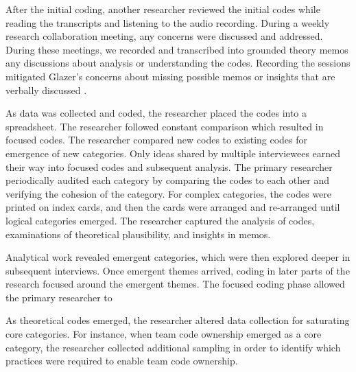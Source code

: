 After the initial coding, another researcher reviewed the initial codes while reading the transcripts and listening to the audio recording. During a weekly research collaboration meeting, any concerns were discussed and addressed. During these meetings, we recorded and transcribed into grounded theory memos any discussions about analysis or understanding the codes. Recording the sessions mitigated Glazer's concerns about missing possible memos or insights that are verbally discussed \cite{GlaserTheoreticalSensitivity}.

As data was collected and coded, the researcher placed the codes into a spreadsheet. The researcher followed constant comparison which resulted in focused codes.  The researcher compared new codes to existing codes for emergence of new categories. Only ideas shared by multiple interviewees earned their way into focused codes and subsequent analysis. The primary researcher periodically audited each category by comparing the codes to each other and verifying the cohesion of the category. For complex categories, the codes were printed on index cards, and then the cards were arranged and re-arranged until logical categories emerged.  The researcher captured the analysis of codes, examinations of theoretical plausibility, and insights in memos. 

Analytical work revealed emergent categories, which were then explored deeper in subsequent interviews.  Once emergent themes arrived, coding in later parts of the research focused around the emergent themes. The focused coding phase allowed the primary researcher to 

As theoretical codes emerged, the researcher altered data collection for saturating core categories. For instance, when team code ownership emerged as a core category, the researcher collected additional sampling in order to identify which practices were required to enable team code ownership.

